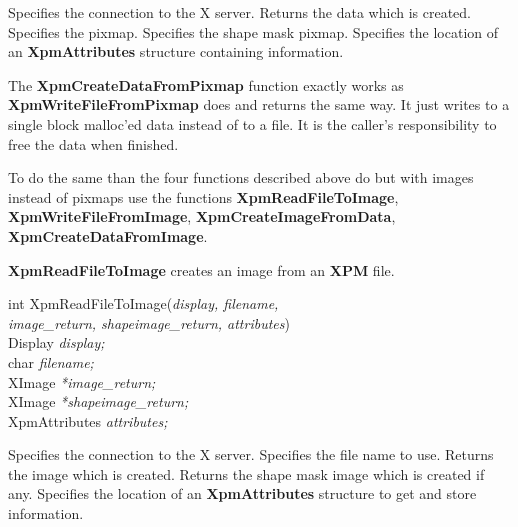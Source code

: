 \begin{description}

 Specifies the connection to the X server.
 Returns the data which is created.
 Specifies the pixmap.
 Specifies the shape mask pixmap.
 Specifies the location of an {\bf XpmAttributes} structure
containing information.

\end{description} 

The {\bf XpmCreateDataFromPixmap} function exactly works as {\bf
Xpm\-Write\-File\-From\-Pixmap} does and returns the same way. It just writes
to a single block malloc'ed data instead of to a file. It is the caller's
responsibility to free the data when finished.

\vspace{.5cm}
To do the same than the four functions described above do but with images
instead of pixmaps use the functions {\bf XpmReadFileToImage}, {\bf
XpmWriteFileFromImage}, {\bf XpmCreateImageFromData}, {\bf
XpmCreateDataFromImage}.

\vspace{.2cm}
{\bf XpmReadFileToImage} creates an image from an {\bf XPM} file.

\begin{flushleft} 

int XpmReadFileToImage({\it display, filename, \\
\hspace{3cm}image\_return, shapeimage\_return, attributes})\\

\hspace{1cm}Display {\it *display;}\\
\hspace{1cm}char {\it *filename;}\\
\hspace{1cm}XImage {\it **image\_return;}\\
\hspace{1cm}XImage {\it **shapeimage\_return;}\\
\hspace{1cm}XpmAttributes {\it *attributes;}

\end{flushleft}

\begin{description}

 Specifies the connection to the X server.
 Specifies the file name to use.
 Returns the image which is created.
 Returns the shape mask image which is created if
any.
 Specifies the location of an {\bf XpmAttributes} structure
to get and store information.

\end{description} 

